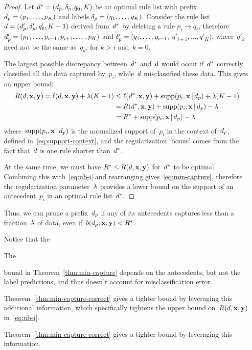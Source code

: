 \begin{arxiv}
\begin{proof}
Let ${d^* = (d_p, \delta_p, q_0, K)}$ be an optimal
rule list with prefix ${d_p = (p_1, \dots, p_K)}$
and labels ${\delta_p = (q_1, \dots, q_K)}$.
%
Consider the rule list ${{d} = (d_p', \delta_p', q_0', K-1)}$
derived from~$d^*$ by deleting a rule ${p_i \rightarrow q_i}$,
therefore ${d_p' = (p_1, \dots, p_{i-1}, p_{i+1}, \dots, p_K)}$
and ${\delta_p' = (q_1, \dots, q_{i-1},}$ ${q'_{i+1}, \dots, q'_K)}$,
where~$q'_k$ need not be the same as~$q_k$, for ${k > i}$ and~${k = 0}$.

The largest possible discrepancy between~$d^*$ and~${d}$ would occur
if~$d^*$ correctly classified all the data captured by~$p_i$,
while~${d}$ misclassified these data.
%
This gives an upper bound:
\begin{align}
R({d}, \mathbf{x}, \mathbf{y}) = \ell({d}, \mathbf{x}, \mathbf{y}) + {\lambda} (K - 1)
&\le \ell(d^*, \mathbf{x}, \mathbf{y}) + \textnormal{supp}(p_i, \mathbf{x} \,|\, d_p) + {\lambda}(K - 1) \nonumber \\
&= R(d^*, \mathbf{x}, \mathbf{y}) + \textnormal{supp}(p_i, \mathbf{x} \,|\, d_p) - {\lambda} \nonumber \\
&= R^* + \textnormal{supp}(p_i, \mathbf{x} \,|\, d_p) - {\lambda}
\label{eq:ub-i}
\end{align}
where~$\textnormal{supp}(p_i, \mathbf{x} \,|\, d_p)$ is the normalized support of~$p_i$
in the context of~$d_p$, defined in~\eqref{eq:support-context},
and the regularization `bonus' comes from the fact that~${d}$
is one rule shorter than~$d^*$.

At the same time, we must have ${R^* \le R({d}, \mathbf{x}, \mathbf{y})}$ for~$d^*$ to be optimal.
%
Combining this with~\eqref{eq:ub-i} and rearranging gives~\eqref{eq:min-capture},
therefore the regularization parameter~${\lambda}$ provides a lower bound
on the support of an antecedent~$p_i$ in an optimal rule list~$d^*$.
\end{proof}
\end{arxiv}

Thus, we can prune a prefix~$d_p$ if any of its antecedents captures less than
a fraction~${\lambda}$ of data, even if~${b(d_p, \mathbf{x}, \mathbf{y}) < R^*}$.
%
\begin{arxiv}
Notice that the
\end{arxiv}
\begin{kdd}
The
\end{kdd}
bound in Theorem~\ref{thm:min-capture}
depends on the antecedents, but not the label predictions,
and thus doesn't account for misclassification error.
%
\begin{arxiv}
Theorem~\ref{thm:min-capture-correct} gives a tighter bound
by leveraging this additional information, which specifically
tightens the upper bound on~$R({d}, \mathbf{x}, \mathbf{y})$ in~\eqref{eq:ub-i}.
\end{arxiv}
\begin{kdd}
Theorem~\ref{thm:min-capture-correct} gives a tighter bound
by leveraging this information.
\end{kdd}

